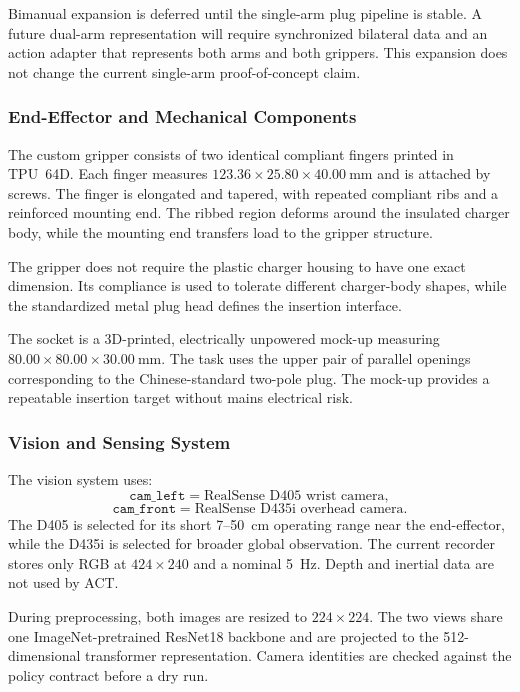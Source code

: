 \documentclass[12pt, letterpaper]{article}
\begin{document}
Bimanual expansion is deferred until the single-arm plug pipeline is stable. A future dual-arm representation will require synchronized bilateral data and an action adapter that represents both arms and both grippers. This expansion does not change the current single-arm proof-of-concept claim.


\subsubsection{End-Effector and Mechanical Components}

The custom gripper consists of two identical compliant fingers printed in TPU~64D. Each finger measures \(123.36\times25.80\times40.00~\mathrm{mm}\) and is attached by screws. The finger is elongated and tapered, with repeated compliant ribs and a reinforced mounting end. The ribbed region deforms around the insulated charger body, while the mounting end transfers load to the gripper structure.

The gripper does not require the plastic charger housing to have one exact dimension. Its compliance is used to tolerate different charger-body shapes, while the standardized metal plug head defines the insertion interface.

The socket is a 3D-printed, electrically unpowered mock-up measuring \(80.00\times80.00\times30.00~\mathrm{mm}\). The task uses the upper pair of parallel openings corresponding to the Chinese-standard two-pole plug. The mock-up provides a repeatable insertion target without mains electrical risk.

\subsubsection{Vision and Sensing System}

The vision system uses:
\[
\texttt{cam\_left}=\text{RealSense D405 wrist camera},
\]
\[
\texttt{cam\_front}=\text{RealSense D435i overhead camera}.
\]
The D405 is selected for its short 7--50~cm operating range near the end-effector, while the D435i is selected for broader global observation. The current recorder stores only RGB at \(424\times240\) and a nominal 5~Hz. Depth and inertial data are not used by ACT.

During preprocessing, both images are resized to \(224\times224\). The two views share one ImageNet-pretrained ResNet18 backbone and are projected to the 512-dimensional transformer representation. Camera identities are checked against the policy contract before a dry run.
\end{document}
